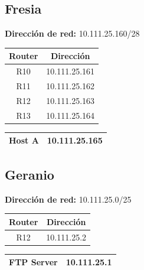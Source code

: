 \subsection{Fresia}
\textbf{Dirección de red:} 10.111.25.160/28
\begin{table}[!htbp]
\centering
  \begin{tabular}{|c|c|}
    \hline
	Router & Dirección\\ \hline
	R10 & 10.111.25.161\\ \hline
	R11 & 10.111.25.162\\ \hline
	R12 & 10.111.25.163\\ \hline
	R13 & 10.111.25.164\\
    \hline
  \end{tabular}
\end{table}

\begin{table}[!htbp]
\centering
  \begin{tabular}{|c|c|}
    \hline
	Host A&10.111.25.165\\
    \hline
  \end{tabular}
\end{table}


\subsection{Geranio}
\textbf{Dirección de red:} 10.111.25.0/25
\begin{table}[!htbp]
\centering
  \begin{tabular}{|c|c|}
    \hline
	Router & Dirección\\ \hline
	R12 & 10.111.25.2\\
    \hline
  \end{tabular}
\end{table}

\begin{table}[!htbp]
\centering
  \begin{tabular}{|c|c|}
    \hline
	FTP Server& 10.111.25.1\\
    \hline
  \end{tabular}
\end{table}

